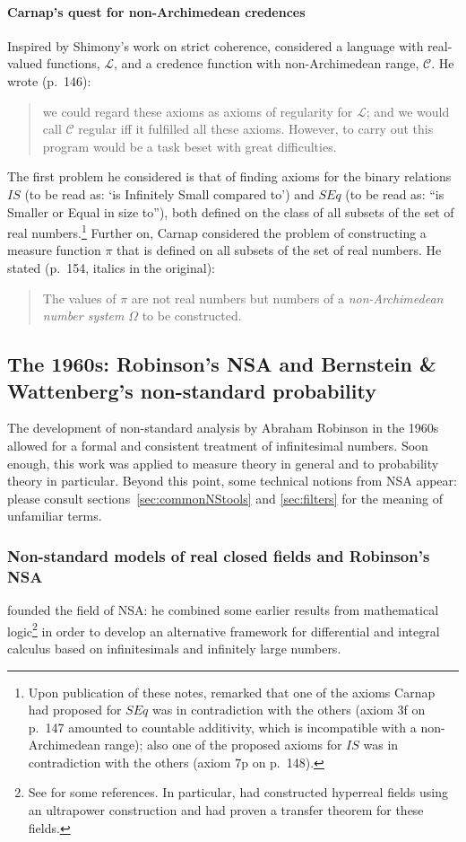 \paragraph{Carnap's quest for non-Archimedean credences}
Inspired by Shimony's work on strict coherence, \citet{Carnap:1980} considered a language with real-valued functions, $\mathcal{L}$, and a credence function with non-Archimedean range, $\mathcal{C}$. He wrote (p.~146):
\begin{quote}
we could regard these axioms as axioms of regularity for $\mathcal{L}$; and we would call $\mathcal{C}$ regular iff it fulfilled all these axioms. However, to carry out this program would be a task beset with great difficulties.
\end{quote}
The first problem he considered is that of finding axioms for the binary relations $IS$ (to be read as: `is Infinitely Small compared to') and $SEq$ (to be read as: ``is Smaller or Equal in size to''), both defined on the class of all subsets of the set of real numbers.\footnote{Upon publication of these notes, \citet{Hoover:1980} remarked that one of the axioms Carnap had proposed for $SEq$ was in contradiction with the others (axiom 3f on p.~147 amounted to countable additivity, which is incompatible with a non-Archimedean range); also one of the proposed axioms for $IS$ was in contradiction with the others (axiom 7p on p.~148).} Further on, Carnap considered the problem of constructing a measure function $\pi$ that is defined on all subsets of the set of real numbers. He stated (p.~154, italics in the original):
\begin{quote}
The values of $\pi$ are not real numbers but numbers of a \emph{non-Archimedean number system} $\Omega$ to be constructed.
\end{quote}

\subsection{The 1960s: Robinson's NSA and Bernstein \& Wattenberg's non-standard probability}
The development of non-standard analysis by Abraham Robinson in the 1960s allowed for a formal and consistent treatment of infinitesimal numbers. Soon enough, this work was applied to measure theory in general and to probability theory in particular. Beyond this point, some technical notions from NSA appear: please consult sections~\ref{sec:commonNStools} and \ref{sec:filters} for the meaning of unfamiliar terms.

\subsubsection*{Non-standard models of real closed fields and Robinson's NSA}\label{sec:RCFs}
\citet{Robinson:1961,Robinson:1966} founded the field of NSA: he combined some earlier results from mathematical logic\footnote{See \citet[p.~48]{Robinson:1966} for some references. In particular, \citet{Hewitt:1948} had constructed hyperreal fields using an ultrapower construction and \citet{Los:1955} had proven a transfer theorem for these fields.} in order to develop an alternative framework for differential and integral calculus based on infinitesimals and infinitely large numbers.

